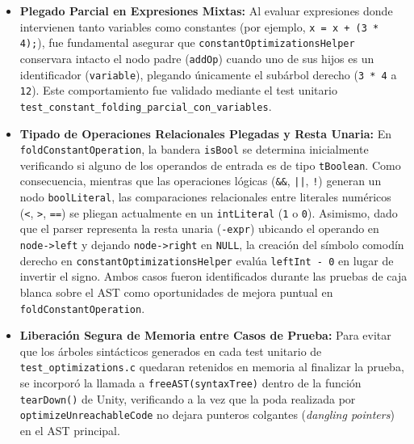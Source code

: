 \documentclass[12pt, a4paper]{article}
\begin{document}
\begin{itemize}
    \item \textbf{Plegado Parcial en Expresiones Mixtas:} Al evaluar expresiones donde intervienen tanto variables como constantes (por ejemplo, \texttt{x = x + (3 * 4);}), fue fundamental asegurar que \texttt{constant\allowbreak Optimizations\allowbreak Helper} conservara intacto el nodo padre (\texttt{addOp}) cuando uno de sus hijos es un identificador (\texttt{variable}), plegando únicamente el subárbol derecho (\texttt{3 * 4} a \texttt{12}). Este comportamiento fue validado mediante el test unitario \texttt{test\_\allowbreak constant\_\allowbreak folding\_\allowbreak parcial\_\allowbreak con\_\allowbreak variables}.
    \item \textbf{Tipado de Operaciones Relacionales Plegadas y Resta Unaria:} En \texttt{fold\allowbreak Constant\allowbreak Operation}, la bandera \texttt{isBool} se determina inicialmente verificando si alguno de los operandos de entrada es de tipo \texttt{tBoolean}. Como consecuencia, mientras que las operaciones lógicas (\texttt{\&\&}, \texttt{||}, \texttt{!}) generan un nodo \texttt{boolLiteral}, las comparaciones relacionales entre literales numéricos (\texttt{<}, \texttt{>}, \texttt{==}) se pliegan actualmente en un \texttt{intLiteral} (\texttt{1} o \texttt{0}). Asimismo, dado que el parser representa la resta unaria (\texttt{-expr}) ubicando el operando en \texttt{node->left} y dejando \texttt{node->right} en \texttt{NULL}, la creación del símbolo comodín derecho en \texttt{constant\allowbreak Optimizations\allowbreak Helper} evalúa \texttt{leftInt - 0} en lugar de invertir el signo. Ambos casos fueron identificados durante las pruebas de caja blanca sobre el AST como oportunidades de mejora puntual en \texttt{fold\allowbreak Constant\allowbreak Operation}.
    \item \textbf{Liberación Segura de Memoria entre Casos de Prueba:} Para evitar que los árboles sintácticos generados en cada test unitario de \texttt{test\_optimizations.c} quedaran retenidos en memoria al finalizar la prueba, se incorporó la llamada a \texttt{freeAST(syntaxTree)} dentro de la función \texttt{tearDown()} de Unity, verificando a la vez que la poda realizada por \texttt{optimize\allowbreak Unreachable\allowbreak Code} no dejara punteros colgantes (\textit{dangling pointers}) en el AST principal.
\end{itemize}
\end{document}
